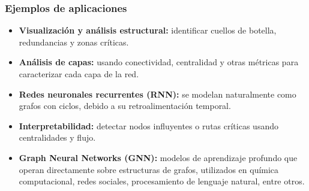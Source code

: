 \subsubsection*{Ejemplos de aplicaciones}

\begin{itemize}
    \item \textbf{Visualización y análisis estructural:} identificar cuellos de botella, redundancias y zonas críticas.
    \item \textbf{Análisis de capas:} usando conectividad, centralidad y otras métricas para caracterizar cada capa de la red.
    \item \textbf{Redes neuronales recurrentes (RNN):} se modelan naturalmente como grafos con ciclos, debido a su retroalimentación temporal.
    \item \textbf{Interpretabilidad:} detectar nodos influyentes o rutas críticas usando centralidades y flujo.
    \item \textbf{Graph Neural Networks (GNN):} modelos de aprendizaje profundo que operan directamente sobre estructuras de grafos, utilizados en química computacional, redes sociales, procesamiento de lenguaje natural, entre otros.
\end{itemize}
